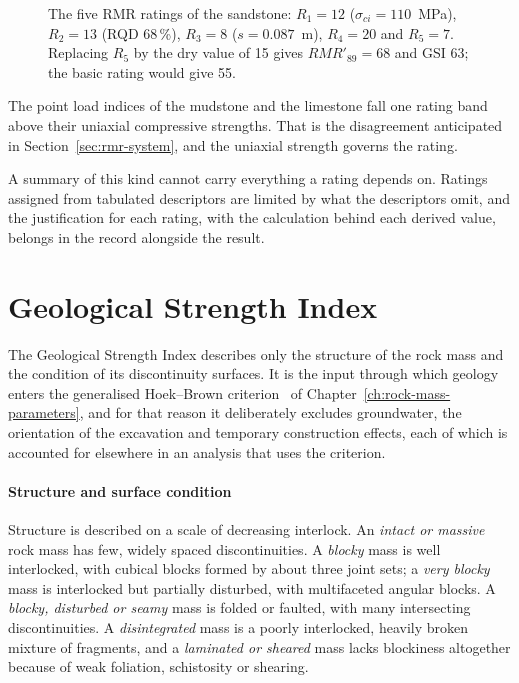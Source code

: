 \begin{figure}[htbp]
\centering
{}
\caption{The five RMR ratings of the sandstone: $R_1 = 12$ ($\sigma_{ci} = 110$~MPa), $R_2 = 13$ (RQD 68\,\%), $R_3 = 8$ ($s = 0.087$~m), $R_4 = 20$ and $R_5 = 7$. Replacing $R_5$ by the dry value of 15 gives $RMR'_{89} = 68$ and GSI 63; the basic rating would give 55.}
\label{fig:rmr-sandstone}
\end{figure}

The point load indices of the mudstone and the limestone fall one rating band
above their uniaxial compressive strengths. That is the disagreement
anticipated in Section~\ref{sec:rmr-system}, and the uniaxial strength
governs the rating.

A summary of this kind cannot carry everything a rating depends on. Ratings
assigned from tabulated descriptors are limited by what the descriptors omit, and
the justification for each rating, with the calculation behind each derived
value, belongs in the record alongside the result.

\section{Geological Strength Index}
\label{sec:geological-strength-index}

The Geological Strength Index describes only the structure of the
rock mass and the condition of its discontinuity surfaces. It is the input
through which geology enters the generalised Hoek--Brown
criterion~\citep{hoek2019hb} of Chapter~\ref{ch:rock-mass-parameters}, and for
that reason it deliberately excludes groundwater, the orientation of the
excavation and temporary construction effects, each of which is accounted for
elsewhere in an analysis that uses the criterion.

\paragraph{Structure and surface condition}
Structure is described on a scale of decreasing interlock. An \emph{intact or
massive} rock mass has few, widely spaced discontinuities. A \emph{blocky}
mass is well interlocked, with cubical blocks formed by about three joint
sets; a \emph{very blocky} mass is interlocked but partially disturbed, with
multifaceted angular blocks. A \emph{blocky, disturbed or seamy} mass is
folded or faulted, with many intersecting discontinuities. A
\emph{disintegrated} mass is a poorly interlocked, heavily broken mixture of
fragments, and a \emph{laminated or sheared} mass lacks blockiness altogether
because of weak foliation, schistosity or shearing.

